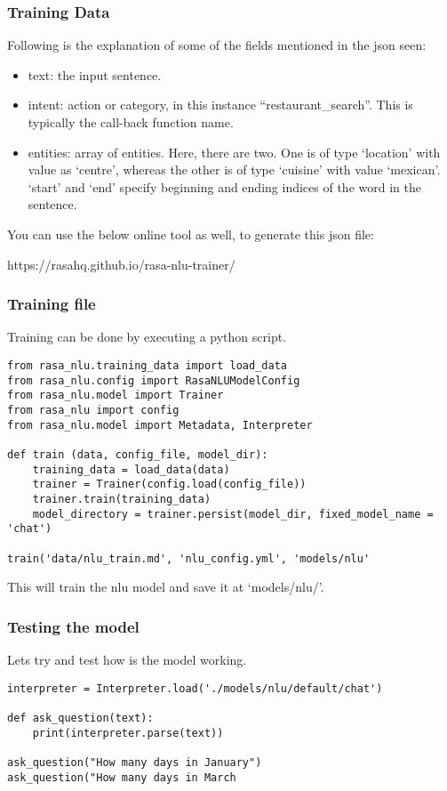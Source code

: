  \begin{frame}[fragile]\frametitle{Training Data}
 Following is the explanation of some of the fields mentioned in the json seen:
\begin{itemize}
\item text: the input sentence.
\item intent: action or category, in this instance ``restaurant\_search''. This is typically the call-back function name.
\item entities: array of entities. Here, there are two. One is of type `location' with value as `centre', whereas the other is of type `cuisine' with value `mexican'. `start' and `end' specify beginning and ending indices of the word in the sentence.
\end{itemize}
You can use the below online tool as well, to generate this json file:

https://rasahq.github.io/rasa-nlu-trainer/
\end{frame}

 \begin{frame}[fragile]\frametitle{Training file}
 
Training can be done by executing a python script.

\begin{lstlisting}
from rasa_nlu.training_data import load_data
from rasa_nlu.config import RasaNLUModelConfig
from rasa_nlu.model import Trainer
from rasa_nlu import config
from rasa_nlu.model import Metadata, Interpreter

def train (data, config_file, model_dir):
    training_data = load_data(data)
    trainer = Trainer(config.load(config_file))
    trainer.train(training_data)
    model_directory = trainer.persist(model_dir, fixed_model_name = 'chat')

train('data/nlu_train.md', 'nlu_config.yml', 'models/nlu'
\end{lstlisting}
This will train the nlu model and save it at ‘models/nlu/’.
\end{frame}

 \begin{frame}[fragile]\frametitle{Testing the model}
 
Lets try and test how is the model working.

\begin{lstlisting}
interpreter = Interpreter.load('./models/nlu/default/chat')

def ask_question(text):
    print(interpreter.parse(text))

ask_question("How many days in January")
ask_question("How many days in March
\end{lstlisting}

\end{frame}

